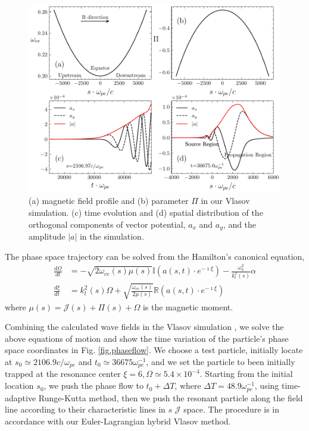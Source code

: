 \begin{figure}
    \centering
    \includegraphics[scale=0.5]{img/aanda.pdf}
    \caption{(a) magnetic field profile and (b) parameter $\Pi$ in our Vlasov simulation. (c) time evolution and (d) spatial distribution of the orthogonal components of vector potential, $a_x$ and $a_y$, and the amplitude $|a|$ in the simulation.
    \label{fig.aanda}
    }
\end{figure}

The phase space trajectory can be solved from the Hamilton's canonical equation,
\begin{equation}\label{eq.lab_eq}
    \begin{aligned}
        \frac{d\Omega}{dt} &= - \sqrt{2\omega_{ce}(s)\mu(s)} \mathbb{I} (a(s,t)\cdot e^{-\imath \xi}) - \frac{\omega^2_{b}}{k_l^2(s)} \alpha
        \\
        \frac{d\xi}{dt} &= k_l^2(s) \Omega +\sqrt{\frac{\omega_{ce}(s)}{2\mu(s)}} \mathbb{R}(a(s,t)\cdot e^{-\imath \xi})
    \end{aligned}
\end{equation}
where $\mu(s) = \mathcal{J}(s)+\Pi(s)+\Omega$ is the magnetic moment.


Combining the calculated wave fields  in the Vlasov simulation \cite{zheng2024}, we solve the above equations of motion and show the time variation of the particle's phase space coordinates in Fig. \ref{fig.phaseflow}.
We choose a test particle, initially locate at $s_0 \simeq 2106.9 c/\omega_{pe}$ and $t_0 \simeq 36675 \omega_{pe}^{-1}$, and we set the particle to been initially trapped at the resonance center $\xi = 6, \Omega \simeq 5.4\times10^{-4}$. 
Starting from the initial location $s_0$, we push the phase flow to $t_0 + \Delta T$, where $\Delta T= 48.9 \omega_{pe}^{-1}$, using time-adaptive Runge-Kutta method, then we push the resonant particle along the field line according to their characteristic lines in $s$ $\mathcal{J}$ space.
The procedure is in accordance with our Euler-Lagrangian hybrid Vlasov method.

